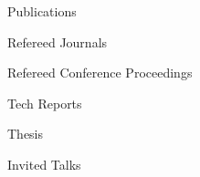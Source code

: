 
\begin{rSection}{Publications}
  \begin{rSubsection}{Refereed Journals}{}{}{}
    \printbibliography[keyword=journal,heading=none]
  \end{rSubsection}
  \begin{rSubsection}{Refereed Conference Proceedings}{}{}{}
    \printbibliography[keyword=proceeding,heading=none]
  \end{rSubsection}
  \begin{rSubsection}{Tech Reports}{}{}{}
    \printbibliography[keyword=techReport,heading=none]
  \end{rSubsection}
  \begin{rSubsection}{Thesis}{}{}{}
    \printbibliography[keyword=thesis,heading=none]
  \end{rSubsection}
  \begin{rSubsection}{Invited Talks}{}{}{}
    \printbibliography[keyword=invitedTalk,heading=none]
  \end{rSubsection}
\end{rSection}
